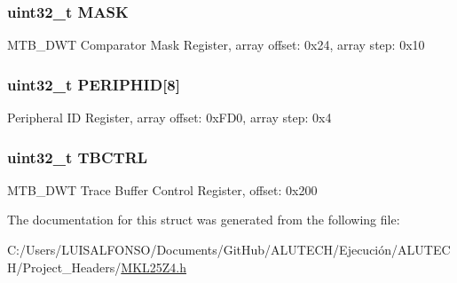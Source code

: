 \subsubsection[{M\+A\+S\+K}]{\setlength{\rightskip}{0pt plus 5cm}uint32\+\_\+t M\+A\+S\+K}\label{struct_m_t_b_d_w_t___mem_map_a33f6052ebf71e72af18f19c6edadafc4}
M\+T\+B\+\_\+\+D\+W\+T Comparator Mask Register, array offset\+: 0x24, array step\+: 0x10 \hypertarget{struct_m_t_b_d_w_t___mem_map_ab6fdc70dd1345592145d79d210ee616d}{}
\subsubsection[{P\+E\+R\+I\+P\+H\+I\+D}]{\setlength{\rightskip}{0pt plus 5cm}uint32\+\_\+t P\+E\+R\+I\+P\+H\+I\+D\mbox{[}8\mbox{]}}\label{struct_m_t_b_d_w_t___mem_map_ab6fdc70dd1345592145d79d210ee616d}
Peripheral I\+D Register, array offset\+: 0x\+F\+D0, array step\+: 0x4 \hypertarget{struct_m_t_b_d_w_t___mem_map_a6efc9cce972933a09ad4baee83a38ac3}{}
\subsubsection[{T\+B\+C\+T\+R\+L}]{\setlength{\rightskip}{0pt plus 5cm}uint32\+\_\+t T\+B\+C\+T\+R\+L}\label{struct_m_t_b_d_w_t___mem_map_a6efc9cce972933a09ad4baee83a38ac3}
M\+T\+B\+\_\+\+D\+W\+T Trace Buffer Control Register, offset\+: 0x200 

The documentation for this struct was generated from the following file\+:\begin{DoxyCompactItemize}
\item 
C\+:/\+Users/\+L\+U\+I\+S\+A\+L\+F\+O\+N\+S\+O/\+Documents/\+Git\+Hub/\+A\+L\+U\+T\+E\+C\+H/\+Ejecución/\+A\+L\+U\+T\+E\+C\+H/\+Project\+\_\+\+Headers/\hyperlink{_m_k_l25_z4_8h}{M\+K\+L25\+Z4.\+h}\end{DoxyCompactItemize}
